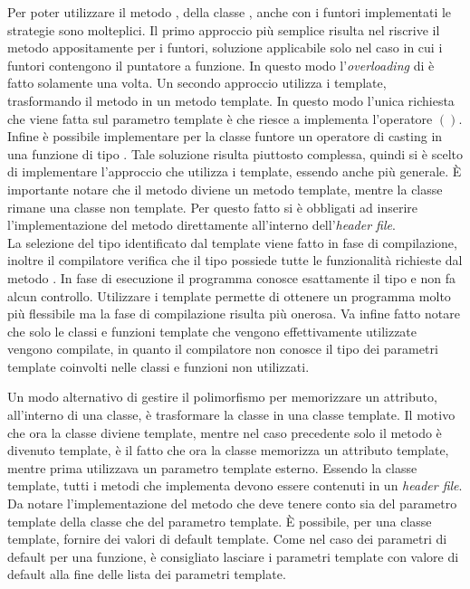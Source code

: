 Per poter utilizzare il metodo , della classe ,
anche con i funtori implementati le strategie sono molteplici. 
Il primo approccio pi\`u semplice risulta nel riscrive il
metodo appositamente per i funtori, soluzione applicabile solo nel caso in cui
i funtori contengono il puntatore a funzione. In questo modo
l'\textit{overloading} di  \`e fatto solamente una volta. 
Un secondo approccio utilizza i template, trasformando il metodo  in
un metodo template. In questo modo l'unica richiesta che viene fatta sul
parametro template \`e che riesce a implementa l'operatore $()$. 
Infine \`e possibile implementare per la classe funtore un operatore di casting
in una funzione di tipo .
Tale soluzione risulta piuttosto complessa, quindi si \`e scelto di
implementare l'approccio che utilizza i template, essendo anche pi\`u generale.
\`E importante notare che il metodo  diviene un metodo template,
mentre la classe  rimane una classe non template. 
Per questo fatto si \`e obbligati ad inserire l'implementazione del metodo
 direttamente  all'interno dell'\textit{header file}.\\
La selezione del tipo identificato dal template viene fatto in fase di
compilazione, inoltre il compilatore verifica che il tipo possiede tutte le
funzionalit\`a richieste dal metodo . In fase di esecuzione il
programma conosce esattamente il tipo e non fa alcun controllo. Utilizzare i
template permette di ottenere un programma molto pi\`u flessibile ma la fase
di compilazione risulta pi\`u onerosa. Va infine fatto notare che solo le
classi e funzioni template che vengono effettivamente utilizzate vengono
compilate, in quanto il compilatore non conosce il tipo dei parametri template
coinvolti nelle classi e funzioni non utilizzati.

\lstset{basicstyle=\scriptsize\sf}

\lstset{basicstyle=\sf}

Un modo alternativo di gestire il polimorfismo per memorizzare un attributo,
all'interno di una classe, \`e trasformare la classe  in una 
classe template. Il motivo che ora la classe  diviene template,
mentre nel caso precedente solo il metodo  \`e divenuto template,
\`e il fatto che ora la classe memorizza un attributo template, 
mentre prima utilizzava un parametro template esterno. 
Essendo la classe  template, tutti i metodi che implementa
devono essere contenuti in un \textit{header file}. Da notare l'implementazione
del metodo  che deve tenere conto sia del parametro template della 
classe che del parametro template. \`E possibile, per una classe template, 
fornire dei valori di default template. Come nel caso dei 
parametri di default per una funzione, \`e consigliato lasciare i parametri 
template con valore di default alla fine delle lista dei parametri template.

\lstset{basicstyle=\scriptsize\sf}

\lstset{basicstyle=\sf}
